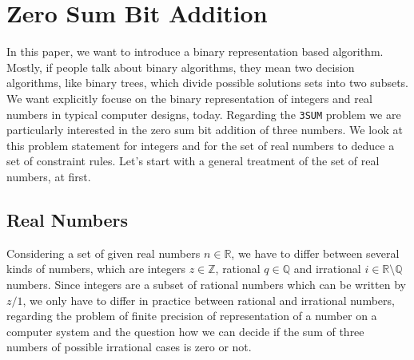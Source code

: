 \section{Zero Sum Bit Addition}
\label{s:zerosumbitaddition}
In this paper, we want to introduce a binary representation based algorithm. Mostly, if people talk about binary algorithms, they mean two decision algorithms, like binary trees, which divide possible solutions sets into two subsets. We want explicitly focuse on the binary representation of integers and real numbers in typical computer designs, today. Regarding the \texttt{3SUM} problem we are particularly interested in the zero sum bit addition of three numbers. We look at this problem statement for integers and for the set of real numbers to deduce a set of constraint rules. Let's start with a general treatment of the set of real numbers, at first.
\subsection{Real Numbers}
\label{ss:realnumbers}
Considering a set of given real numbers $n \in \mathbb{R}$, we have to differ between several kinds of numbers, which are integers $z \in \mathbb{Z}$, rational $q \in \mathbb{Q}$ and irrational $i \in \mathbb{R} \setminus \mathbb{Q}$ numbers. Since integers are a subset of rational numbers which can be written by $z/1$, we only have to differ in practice between rational and irrational numbers, regarding the problem of finite precision of representation of a number on a computer system and the question how we can decide if the sum of three numbers of possible irrational cases is zero or not. 

